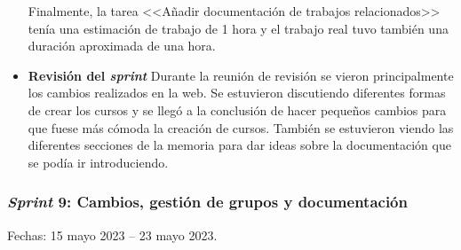 \begin{itemize}
Finalmente, la tarea <<Añadir documentación de trabajos relacionados>> tenía una estimación de trabajo de 1 hora y el trabajo real tuvo también una duración aproximada de una hora.


\item\textbf{Revisión del \textit{sprint}}
Durante la reunión de revisión se vieron principalmente los cambios realizados en la web. Se estuvieron discutiendo diferentes formas de crear los cursos y se llegó a la conclusión de hacer pequeños cambios para que fuese más cómoda la creación de cursos.
También se estuvieron viendo las diferentes secciones de la memoria para dar ideas sobre la documentación que se podía ir introduciendo.
\end{itemize}


\subsubsection{\textit{Sprint} 9: Cambios, gestión de grupos y documentación}
Fechas: 15 mayo 2023 -- 23 mayo 2023.
